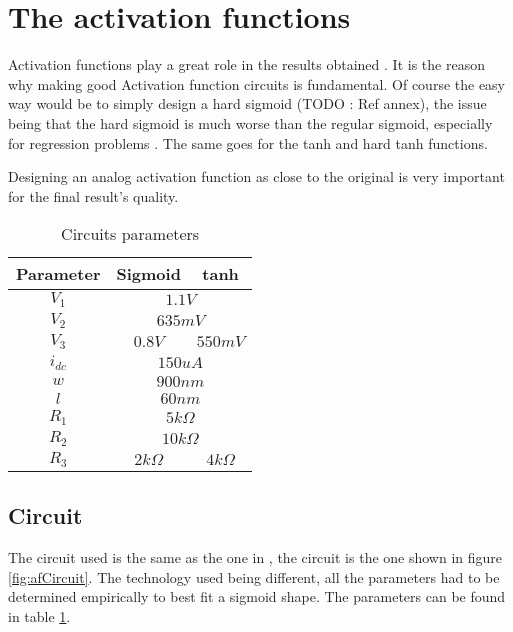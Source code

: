 \section{The activation functions}
\label{sec:af}

Activation functions play a great role in the results obtained \cite{af}. It is the reason why making good Activation function circuits is fundamental. Of course the easy way would be to simply design a hard sigmoid (TODO : Ref annex), the issue being that the hard sigmoid is much worse than the regular sigmoid, especially for regression problems \cite{hardSigm}. The same goes for the \ac{tanh} and hard \ac{tanh} functions.

Designing an analog activation function as close to the original is very important for the final result's quality.

\begin{table}[H]
  \centering
  \caption{Circuits parameters}
  \begin{tabular}{|c|c|c|}
    \hline
    \rowcolor{gray}
    Parameter & Sigmoid & \ac{tanh} \\
    \hline
    $V_1$ & \multicolumn{2}{c|}{$1.1V$}\\
    \hline
    $V_2$ & \multicolumn{2}{c|}{$635mV$}\\
    \hline
    $V_3$ & $0.8V$ & $550mV$\\
    \hline
    $i_{dc}$ & \multicolumn{2}{c|}{$150uA$}\\
    \hline
    $w$ & \multicolumn{2}{c|}{$900nm$}\\
    \hline
    $l$ & \multicolumn{2}{c|}{$60nm$}\\
    \hline
    $R_1$ & \multicolumn{2}{c|}{$5k\Omega$}\\
    \hline
    $R_2$ & \multicolumn{2}{c|}{$10k\Omega$}\\
    \hline
    $R_3$ & $2k\Omega$ & $4k\Omega$\\
    \hline
  \end{tabular}
  \label{tab:afPar}
\end{table}

\subsection{Circuit}

The circuit used is the same as the one in \cite{thesisRef}, the circuit is the one shown in figure \ref{fig:afCircuit}. The technology used being different, all the parameters had to be determined empirically to best fit a sigmoid shape. The parameters can be found in table \ref{tab:afPar}.

